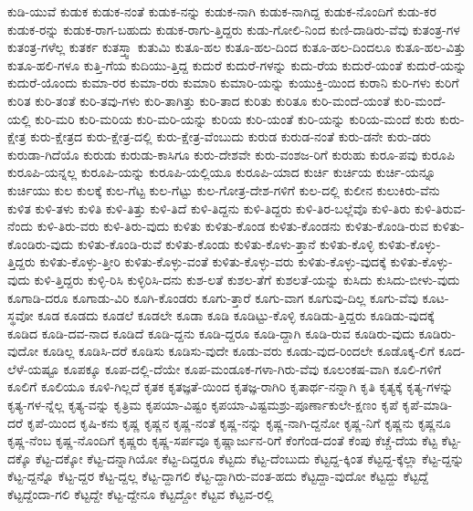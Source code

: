 {ಕುಡಿ-ಯುವೆ
ಕುಡುಕ
ಕುಡುಕ-ನಂತೆ
ಕುಡುಕ-ನನ್ನು
ಕುಡುಕ-ನಾಗಿ
ಕುಡುಕ-ನಾಗಿದ್ದ
ಕುಡುಕ-ನೊಂದಿಗೆ
ಕುಡು-ಕರ
ಕುಡುಕ-ರನ್ನು
ಕುಡುಕ-ರಾಗ-ಬಹುದು
ಕುಡುಕ-ರಾಗು-ತ್ತಿದ್ದರು
ಕುಡು-ಗೋಲಿ-ನಿಂದ
ಕುಣಿ-ದಾಡಿರು-ವೆವು
ಕುತಂತ್ರ-ಗಳ
ಕುತಂತ್ರ-ಗಳೆಲ್ಲ
ಕುತರ್ಕ
ಕುತಸ್ತ್ವಾ
ಕುತುಮಿ
ಕುತೂ-ಹಲ
ಕುತೂ-ಹಲ-ದಿಂದ
ಕುತೂ-ಹಲ-ದಿಂದಲೂ
ಕುತೂ-ಹಲ-ವಿತ್ತು
ಕುತೂ-ಹಲಿ-ಗಳೂ
ಕುತ್ತಿ-ಗೆಯ
ಕುದಿಯು-ತ್ತಿದ್ದ
ಕುದುರೆ
ಕುದುರೆ-ಗಳನ್ನು
ಕುದು-ರೆಯ
ಕುದುರೆ-ಯಂತೆ
ಕುದುರೆ-ಯನ್ನು
ಕುದುರೆ-ಯೊಂದು
ಕುಮಾ-ರರ
ಕುಮಾ-ರರು
ಕುಮಾರಿ
ಕುಮಾರಿ-ಯನ್ನು
ಕುಯುಕ್ತಿ-ಯಿಂದ
ಕುರಾನಿ
ಕುರಿ-ಗಳು
ಕುರಿಗೆ
ಕುರಿತ
ಕುರಿ-ತಂತೆ
ಕುರಿ-ತವು-ಗಳು
ಕುರಿ-ತಾಗಿತ್ತು
ಕುರಿ-ತಾದ
ಕುರಿತು
ಕುರಿತೂ
ಕುರಿ-ಮಂದೆ-ಯಂತೆ
ಕುರಿ-ಮಂದೆ-ಯಲ್ಲಿ
ಕುರಿ-ಮರಿ
ಕುರಿ-ಮರಿಯ
ಕುರಿ-ಮರಿ-ಯನ್ನು
ಕುರಿಯ
ಕುರಿ-ಯಂತೆ
ಕುರಿ-ಯನ್ನು
ಕುರಿಯ-ಮಂದೆ
ಕುರು
ಕುರು-ಕ್ಷೇತ್ರ
ಕುರು-ಕ್ಷೇತ್ರದ
ಕುರು-ಕ್ಷೇತ್ರ-ದಲ್ಲಿ
ಕುರು-ಕ್ಷೇತ್ರ-ವೆಂಬುದು
ಕುರುಡ
ಕುರುಡ-ನಂತೆ
ಕುರು-ಡನೇ
ಕುರು-ಡರು
ಕುರುಡಾ-ಗಿದೆಯೊ
ಕುರುಡು
ಕುರುಡು-ಕಾಸಿಗೂ
ಕುರು-ದೇಶವೇ
ಕುರು-ವಂಶಜ-ರಿಗೆ
ಕುರುಹು
ಕುರೂ-ಪವು
ಕುರೂಪಿ
ಕುರೂಪಿ-ಯನ್ನಲ್ಲ
ಕುರೂಪಿ-ಯನ್ನು
ಕುರೂಪಿ-ಯಲ್ಲಿಯೂ
ಕುರೂಪಿ-ಯಾದ
ಕುರ್ಚಿ
ಕುರ್ಚಿಯ
ಕುರ್ಚಿ-ಯನ್ನೂ
ಕುರ್ಚಿಯು
ಕುಲ
ಕುಲಕ್ಕೆ
ಕುಲ-ಗೆಟ್ಟ
ಕುಲ-ಗೆಟ್ಟು
ಕುಲ-ಗೋತ್ರ-ದೇಶ-ಗಳಿಗೆ
ಕುಲ-ದಲ್ಲಿ
ಕುಲೀನ
ಕುಲುಕಿರು-ವೆನು
ಕುಳಿತ
ಕುಳಿ-ತಳು
ಕುಳಿತಿ
ಕುಳಿ-ತಿತ್ತು
ಕುಳಿ-ತಿದೆ
ಕುಳಿ-ತಿದ್ದನು
ಕುಳಿ-ತಿದ್ದರು
ಕುಳಿ-ತಿರ-ಬಲ್ಲೆವೊ
ಕುಳಿ-ತಿರು
ಕುಳಿ-ತಿರುವ-ನೆಂದು
ಕುಳಿ-ತಿರು-ವರು
ಕುಳಿ-ತಿರು-ವುದು
ಕುಳಿತು
ಕುಳಿತು-ಕೊಂಡ
ಕುಳಿತು-ಕೊಂಡನು
ಕುಳಿತು-ಕೊಂಡಿ-ರುವ
ಕುಳಿತು-ಕೊಂಡಿರು-ವುದು
ಕುಳಿತು-ಕೊಂಡಿ-ರುವೆ
ಕುಳಿತು-ಕೊಂಡು
ಕುಳಿತು-ಕೊಳು-ತ್ತಾನೆ
ಕುಳಿತು-ಕೊಳ್ಳಿ
ಕುಳಿತು-ಕೊಳ್ಳು-ತ್ತಿದ್ದರು
ಕುಳಿತು-ಕೊಳ್ಳು-ತ್ತೀರಿ
ಕುಳಿತು-ಕೊಳ್ಳು-ವಂತೆ
ಕುಳಿತು-ಕೊಳ್ಳು-ವರು
ಕುಳಿತು-ಕೊಳ್ಳು-ವುದಕ್ಕೆ
ಕುಳಿತು-ಕೊಳ್ಳು-ವುದು
ಕುಳಿ-ತ್ತಿದ್ದರು
ಕುಳ್ಳಿ-ರಿಸಿ
ಕುಳ್ಳಿರಿಸಿ-ದನು
ಕುಶ-ಲತೆ
ಕುಶಲ-ತೆಗೆ
ಕುಶಲತೆ-ಯನ್ನು
ಕುಸಿದು
ಕುಸಿದು-ಬೀಳು-ವುದು
ಕೂಗಾಡಿ-ದರೂ
ಕೂಗಾಡು-ವಿರಿ
ಕೂಗಿ-ಕೊಂಡರು
ಕೂಗು-ತ್ತಾರೆ
ಕೂಗು-ವಾಗ
ಕೂಗುವು-ದಿಲ್ಲ
ಕೂಗು-ವೆವು
ಕೂಟ-ಸ್ಥವೋ
ಕೂಡ
ಕೂಡದು
ಕೂಡಲೆ
ಕೂಡಲೇ
ಕೂಡಾ
ಕೂಡಿ
ಕೂಡಿಟ್ಟು-ಕೊಳ್ಳಿ
ಕೂಡಿಡು-ತ್ತಿದ್ದರು
ಕೂಡಿಡು-ವುದಕ್ಕೆ
ಕೂಡಿದ
ಕೂಡಿ-ದವ-ನಾದ
ಕೂಡಿದೆ
ಕೂಡಿ-ದ್ದನು
ಕೂಡಿ-ದ್ದರೂ
ಕೂಡಿ-ದ್ದಾಗಿ
ಕೂಡಿ-ರುವ
ಕೂಡಿರು-ವುದು
ಕೂಡಿರು-ವುದೋ
ಕೂಡಿಲ್ಲ
ಕೂಡಿಸಿ-ದರೆ
ಕೂಡಿಸು
ಕೂಡಿಸು-ವುದೇ
ಕೂಡು-ವರು
ಕೂಡು-ವುದ-ರಿಂದಲೇ
ಕೂಡೊಕ್ಕ-ಲಿಗೆ
ಕೂದ-ಲೆಳೆ-ಯಷ್ಟೂ
ಕೂಪಕ್ಕೂ
ಕೂಪ-ದಲ್ಲಿ-ದೆಯೇ
ಕೂಪ-ಮಂಡೂಕ-ಗಳಾ-ಗಿರು-ವೆವು
ಕೂಲಂಕಷ-ವಾಗಿ
ಕೂಲಿ-ಗಳಿಗೆ
ಕೂಲಿಗೆ
ಕೂಲಿಯೂ
ಕೂಳಿ-ಗಿಲ್ಲದೆ
ಕೃತಕ
ಕೃತಜ್ಞತೆ-ಯಿಂದ
ಕೃತಜ್ಞ-ರಾಗಿರಿ
ಕೃತಾರ್ಥ-ನನ್ನಾಗಿ
ಕೃತಿ
ಕೃತ್ಯಕ್ಕೆ
ಕೃತ್ಯ-ಗಳನ್ನು
ಕೃತ್ಯ-ಗಳ-ನ್ನೆಲ್ಲ
ಕೃತ್ಯ-ವನ್ನು
ಕೃತ್ರಿಮ
ಕೃಪಯಾ-ವಿಷ್ಟಂ
ಕೃಪಯಾ-ವಿಷ್ಟಮಶ್ರು-ಪೂರ್ಣಾಕುಲೇ-ಕ್ಷಣಂ
ಕೃಪೆ
ಕೃಪೆ-ಮಾಡಿ-ದರೆ
ಕೃಪೆ-ಯಿಂದ
ಕೃಷಿ-ಕನು
ಕೃಷ್ಣ
ಕೃಷ್ಣನ
ಕೃಷ್ಣ-ನಂತೆ
ಕೃಷ್ಣ-ನನ್ನು
ಕೃಷ್ಣ-ನಾಗಿ-ದ್ದನೋ
ಕೃಷ್ಣ-ನಿಗೆ
ಕೃಷ್ಣನು
ಕೃಷ್ಣನೂ
ಕೃಷ್ಣ-ನೆಂಬ
ಕೃಷ್ಣ-ನೊಂದಿಗೆ
ಕೃಷ್ಣರು
ಕೃಷ್ಣ-ಸರ್ಪವೂ
ಕೃಷ್ಣಾರ್ಜುನ-ರಿಗೆ
ಕೆಂಗೆಂಡ-ದಂತೆ
ಕೆಂಪು
ಕೆಚ್ಚೆ-ದೆಯ
ಕೆಟ್ಟ
ಕೆಟ್ಟ-ದಕ್ಕೊ
ಕೆಟ್ಟ-ದಕ್ಕೋ
ಕೆಟ್ಟ-ದನ್ನಾಗಿಯೋ
ಕೆಟ್ಟ-ದಿದ್ದರೂ
ಕೆಟ್ಟದು
ಕೆಟ್ಟ-ದೆಂಬುದು
ಕೆಟ್ಟದ್ದ-ಕ್ಕಿಂತ
ಕೆಟ್ಟದ್ದ-ಕ್ಕೆಲ್ಲಾ
ಕೆಟ್ಟ-ದ್ದನ್ನು
ಕೆಟ್ಟ-ದ್ದನ್ನೊ
ಕೆಟ್ಟ-ದ್ದರ
ಕೆಟ್ಟ-ದ್ದಲ್ಲ
ಕೆಟ್ಟ-ದ್ದಾಗಲಿ
ಕೆಟ್ಟ-ದ್ದಾಗಿರು-ವಂತ-ಹದು
ಕೆಟ್ಟದ್ದಾ-ವುದೋ
ಕೆಟ್ಟದ್ದು
ಕೆಟ್ಟದ್ದೆ
ಕೆಟ್ಟದ್ದೆಂದಾ-ಗಲಿ
ಕೆಟ್ಟದ್ದೇ
ಕೆಟ್ಟ-ದ್ದೇನೂ
ಕೆಟ್ಟದ್ದೋ
ಕೆಟ್ಟವ
ಕೆಟ್ಟವ-ರಲ್ಲಿ
}
